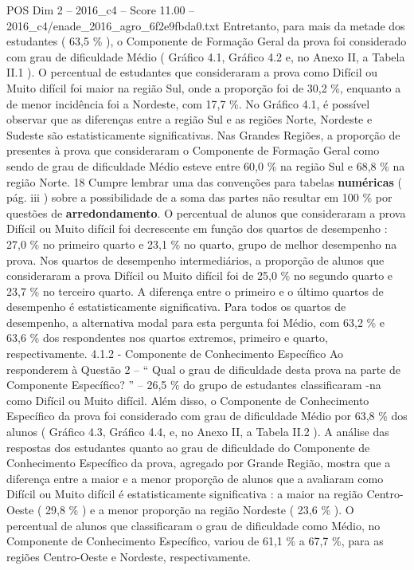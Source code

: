 \begin{textsample}{POS Dim 2 – 2016\_c4 – Score 11.00 – 2016\_c4/enade\_2016\_agro\_6f2e9fbda0.txt}
Entretanto, para mais da metade dos estudantes ( 63,5 \% ), o Componente de Formação Geral da prova foi considerado com grau de dificuldade Médio ( Gráfico 4.1, Gráfico 4.2 e, no Anexo II, a Tabela II.1 ).
O percentual de estudantes que consideraram a prova como Difícil ou Muito difícil foi maior na região Sul, onde a proporção foi de 30,2 \%, enquanto a de menor incidência foi a Nordeste, com 17,7 \%.
No Gráfico 4.1, é possível observar que as diferenças entre a região Sul e as regiões Norte, Nordeste e Sudeste são estatisticamente significativas.
Nas Grandes Regiões, a proporção de presentes à prova que consideraram o Componente de Formação Geral como sendo de grau de dificuldade Médio esteve entre 60,0 \% na região Sul e 68,8 \% na região Norte. 18 Cumpre lembrar uma das convenções para tabelas \textbf{numéricas} ( pág. iii ) sobre a possibilidade de a soma das partes não resultar em 100 \% por questões de \textbf{arredondamento}.
O percentual de alunos que consideraram a prova Difícil ou Muito difícil foi decrescente em função dos quartos de desempenho : 27,0 \% no primeiro quarto e 23,1 \% no quarto, grupo de melhor desempenho na prova.
Nos quartos de desempenho intermediários, a proporção de alunos que consideraram a prova Difícil ou Muito difícil foi de 25,0 \% no segundo quarto e 23,7 \% no terceiro quarto.
A diferença entre o primeiro e o último quartos de desempenho é estatisticamente significativa.
Para todos os quartos de desempenho, a alternativa modal para esta pergunta foi Médio, com 63,2 \% e 63,6 \% dos respondentes nos quartos extremos, primeiro e quarto, respectivamente. 4.1.2 - Componente de Conhecimento Específico Ao responderem à Questão 2 – “ Qual o grau de dificuldade desta prova na parte de Componente Específico? ” – 26,5 \% do grupo de estudantes classificaram -na como Difícil ou Muito difícil.
Além disso, o Componente de Conhecimento Específico da prova foi considerado com grau de dificuldade Médio por 63,8 \% dos alunos ( Gráfico 4.3, Gráfico 4.4, e, no Anexo II, a Tabela II.2 ).
A análise das respostas dos estudantes quanto ao grau de dificuldade do Componente de Conhecimento Específico da prova, agregado por Grande Região, mostra que a diferença entre a maior e a menor proporção de alunos que a avaliaram como Difícil ou Muito difícil é estatisticamente significativa : a maior na região Centro-Oeste ( 29,8 \% ) e a menor proporção na região Nordeste ( 23,6 \% ).
O percentual de alunos que classificaram o grau de dificuldade como Médio, no Componente de Conhecimento Específico, variou de 61,1 \% a 67,7 \%, para as regiões Centro-Oeste e Nordeste, respectivamente.

\end{textsample}
